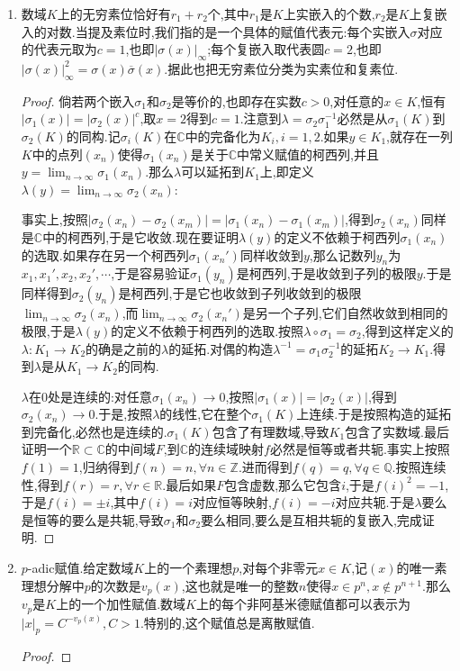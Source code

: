 \begin{enumerate}
	
	
	
	
	
	\item 数域$K$上的无穷素位恰好有$r_1+r_2$个,其中$r_1$是$K$上实嵌入的个数,$r_2$是$K$上复嵌入的对数.当提及素位时,我们指的是一个具体的赋值代表元:每个实嵌入$\sigma$对应的代表元取为$c=1$,也即$|\sigma(x)|_{\infty}$;每个复嵌入取代表圆$c=2$,也即$|\sigma(x)|^2_{\infty}=\sigma(x)\overline{\sigma}(x)$.据此也把无穷素位分类为实素位和复素位.
	\begin{proof}
		
		倘若两个嵌入$\sigma_1$和$\sigma_2$是等价的,也即存在实数$c>0$,对任意的$x\in K$,恒有$|\sigma_1(x)|=|\sigma_2(x)|^c$,取$x=2$得到$c=1$.注意到$\lambda=\sigma_2\sigma_1^{-1}$必然是从$\sigma_1(K)$到$\sigma_2(K)$的同构.记$\sigma_i(K)$在$\mathbb{C}$中的完备化为$K_i,i=1,2$.如果$y\in K_1$,就存在一列$K$中的点列$(x_n)$使得$\sigma_1(x_n)$是关于$\mathbb{C}$中常义赋值的柯西列,并且$y=\lim_{n\to\infty}\sigma_1(x_n)$.那么$\lambda$可以延拓到$K_1$上,即定义$\lambda(y)=\lim_{n\to\infty}\sigma_2(x_n)$:
		
		事实上,按照$|\sigma_2(x_n)-\sigma_2(x_m)|=|\sigma_1(x_n)-\sigma_1(x_m)|$,得到$\sigma_2(x_n)$同样是$\mathbb{C}$中的柯西列,于是它收敛.现在要证明$\lambda(y)$的定义不依赖于柯西列$\sigma_1(x_n)$的选取.如果存在另一个柯西列$\sigma_1(x_n')$同样收敛到$y$,那么记数列$y_n$为$x_1,x_1',x_2,x_2',\cdots$,于是容易验证$\sigma_1(y_n)$是柯西列,于是收敛到子列的极限$y$.于是同样得到$\sigma_2(y_n)$是柯西列,于是它也收敛到子列收敛到的极限$\lim_{n\to\infty}\sigma_2(x_n)$,而$\lim_{n\to\infty}\sigma_2(x_n')$是另一个子列,它们自然收敛到相同的极限,于是$\lambda(y)$的定义不依赖于柯西列的选取.按照$\lambda\circ\sigma_1=\sigma_2$,得到这样定义的$\lambda:K_1\to K_2$的确是之前的$\lambda$的延拓.对偶的构造$\lambda^{-1}=\sigma_1\sigma_2^{-1}$的延拓$K_2\to K_1$.得到$\lambda$是从$K_1\to K_2$的同构.
		
		$\lambda$在0处是连续的:对任意$\sigma_1(x_n)\to0$,按照$|\sigma_1(x)|=|\sigma_2(x)|$,得到$\sigma_2(x_n)\to0$.于是,按照$\lambda$的线性,它在整个$\sigma_1(K)$上连续.于是按照构造的延拓到完备化,必然也是连续的.$\sigma_1(K)$包含了有理数域,导致$K_1$包含了实数域.最后证明一个$\mathbb{R}\subset\mathbb{C}$的中间域$F$,到$\mathbb{C}$的连续域映射$f$必然是恒等或者共轭.事实上按照$f(1)=1$,归纳得到$f(n)=n,\forall n\in\mathbb{Z}$.进而得到$f(q)=q,\forall q\in\mathbb{Q}$.按照连续性,得到$f(r)=r,\forall r\in\mathbb{R}$.最后如果$F$包含虚数,那么它包含$i$,于是$f(i)^2=-1$,于是$f(i)=\pm i$,其中$f(i)=i$对应恒等映射,$f(i)=-i$对应共轭.于是$\lambda$要么是恒等的要么是共轭,导致$\sigma_1$和$\sigma_2$要么相同,要么是互相共轭的复嵌入,完成证明.
	\end{proof}
	\item $p$-adic赋值.给定数域$K$上的一个素理想$p$,对每个非零元$x\in K$,记$(x)$的唯一素理想分解中$p$的次数是$v_p(x)$,这也就是唯一的整数$n$使得$x\in p^n,x\not\in p^{n+1}$.那么$v_p$是$K$上的一个加性赋值.数域$K$上的每个非阿基米德赋值都可以表示为$|x|_p=C^{-v_p(x)},C>1$.特别的,这个赋值总是离散赋值.
	\begin{proof}
		

\end{proof}
\end{enumerate}
